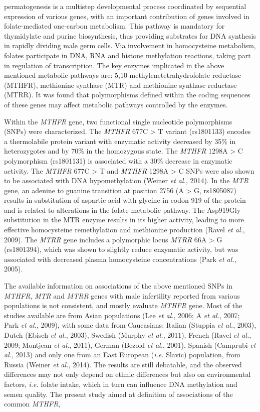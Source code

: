 \par {}permatogenesis is a multistep developmental process coordinated by sequential expression of various genes, with an important contribution of genes involved in folate-mediated one-carbon metabolism. This pathway is mandatory for thymidylate and purine biosynthesis, thus providing substrates for DNA synthesis in rapidly dividing male germ cells. Via involvement in homocysteine metabolism, folates participate in DNA, RNA and histone methylation reactions, taking part in regulation of transcription. The key enzymes implicated in the above mentioned metabolic pathways are: 5,10-methylenetetrahydrofolate reductase (MTHFR), methionine synthase (MTR) and methionine synthase reductase (MTRR). It was found that polymorphisms defined within the coding sequences of these genes may affect metabolic pathways controlled by the enzymes.\par Within the \textit{MTHFR} gene, two functional single nucleotide polymorphisms (SNPs) were characterized. The \textit{MTHFR} 677C > T variant (rs1801133) encodes a thermolabile protein variant with enzymatic activity decreased by 35\% in heterozygotes and by 70\% in the homozygous state. The \textit{MTHFR} 1298A > C polymorphism (rs1801131) is associated with a 30\% decrease in enzymatic activity. The \textit{MTHFR} 677C > T and \textit{MTHFR} 1298A > C SNPs were also shown to be associated with DNA hypomethylation (Weiner \textit{et al.}, 2014). In the \textit{MTR} gene, an adenine to guanine transition at position 2756 (A > G, rs1805087) results in substitution of aspartic acid with glycine in codon 919 of the protein and is related to alterations in the folate metabolic pathway. The Asp919Gly substitution in the MTR enzyme results in its higher activity, leading to more effective homocysteine remethylation and methionine production (Ravel \textit{et al.}, 2009). The \textit{MTRR} gene includes a polymorphic locus \textit{MTRR} 66A > G (rs1801394), which was shown to slightly reduce enzymatic activity, but was associated with decreased plasma homocysteine concentrations (Park \textit{et al.}, 2005).\par The available information on associations of the above mentioned SNPs in \textit{MTHFR}, \textit{MTR} and \textit{MTRR} genes with male infertility reported from various populations is not consistent, and mostly evaluate \textit{MTHFR} gene. Most of the studies available are from Asian populations (Lee \textit{et al.}, 2006; A \textit{et al.}, 2007; Park \textit{et al.}, 2009), with some data from Caucasians: Italian (Stuppia \textit{et al.}, 2003), Dutch (Ebisch \textit{et al.}, 2003), Swedish (Murphy \textit{et al.}, 2011), French (Ravel \textit{et al.}, 2009; Montjean \textit{et al.}, 2011), German (Bezold \textit{et al.}, 2001), Spanish (Camprubi \textit{et al.}, 2013) and only one from an East European (\textit{i.e.} Slavic) population, from Russia (Weiner \textit{et al.}, 2014). The results are still debatable, and the observed differences may not only depend on ethnic differences but also on environmental factors, \textit{i.e.} folate intake, which in turn can influence DNA methylation and semen quality. The present study aimed at definition of associations of the common \textit{MTHFR}, 